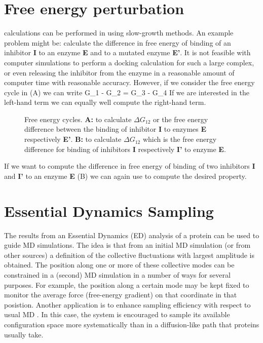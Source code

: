 \section{Free energy perturbation}
\label{sec:fepalg}
 calculations can be performed
in {\gromacs} using slow-growth methods. An example problem might be:
calculate the difference in free energy of binding of an inhibitor {\bf I}
to an enzyme {\bf E} and to a mutated enzyme {\bf E'}.
It is not feasible with computer simulations to perform a docking
calculation for such a large complex, or even releasing the inhibitor from
the enzyme in a reasonable amount of computer time with reasonable accuracy.
However, if we consider the free energy cycle in (A)
we can write
\beq
\Delta G_1 - \Delta G_2	=	\Delta G_3 - \Delta G_4
\label{eqn:ddg}
\eeq
If we are interested in the left-hand term we can equally well compute
the right-hand term.
\begin{figure}
\centerline{\hspace{2cm}}
\caption{Free energy cycles. {\bf A:} to calculate $\Delta G_{12}$ or the free energy difference between the binding of inhibitor {\bf I} to enzymes {\bf E} respectively {\bf E'}. {\bf B:} to calculate $\Delta G_{12}$ which is the free energy difference for binding of inhibitors {\bf I} respectively {\bf I'} to enzyme {\bf E}.}
\label{fig:free}
\end{figure}

If we want to compute the difference in free energy of binding of two
inhibitors {\bf I} and {\bf I'} to an enzyme {\bf E} (B)
we can again use  to compute the desired property.

\section{Essential Dynamics Sampling}
The results from an Essential Dynamics (ED) analysis \cite{Amadei93}
of a protein can be used to guide MD simulations. The idea is that
from an initial MD simulation (or from other sources) a definition of
the collective fluctuations with largest amplitude is obtained. The
position along one or more of these collective modes can be
constrained in a (second) MD simulation in a number of ways for
several purposes. For example, the position along a certain mode may
be kept fixed to monitor the average force (free-energy gradient) on
that coordinate in that posistion. Another application is to enhance
sampling efficiency with respect to usual MD
\cite{Degroot96a,Degroot96b}. In this case, the system is encouraged
to sample its available configuration space more systematically than
in a diffusion-like path that proteins usually take.

